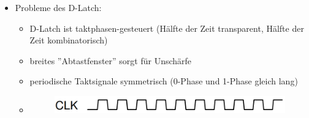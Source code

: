 \documentclass[11pt,a4paper]{article}
\begin{document}
\begin{itemize}
\begin{itemize}
	\item Probleme des D-Latch:
		\begin{itemize}
		\item D-Latch ist taktphasen-gesteuert (Hälfte der Zeit transparent, Hälfte der Zeit kombinatorisch)
		\item breites ''Abtastfenster'' sorgt für Unschärfe
		\item periodische Taktsignale symmetrisch (0-Phase und 1-Phase gleich lang)
		\item[] \begin{figure}[H]
				\begin{center}
				\includegraphics[height=0.75cm]{Bilder/dlatch3}
				\end{center}
			\end{figure}
		\end{itemize}
	\end{itemize}

\end{itemize}
\end{document}
